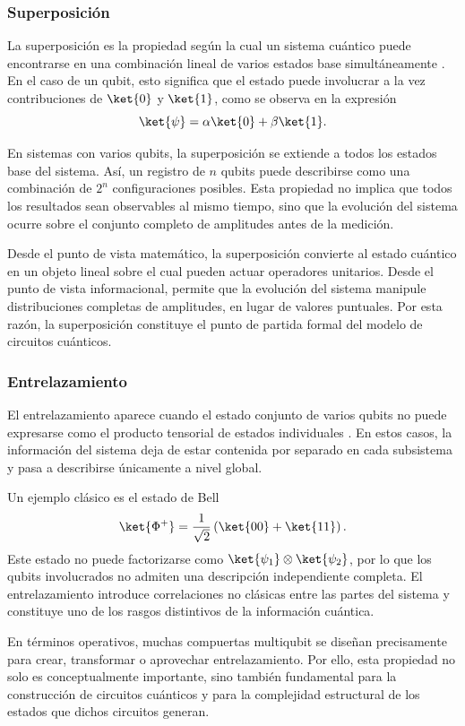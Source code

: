 \subsubsection{Superposición}

La superposición es la propiedad según la cual un sistema cuántico puede encontrarse en una combinación lineal de varios estados base simultáneamente \cite{Nielsen2010}. En el caso de un qubit, esto significa que el estado puede involucrar a la vez contribuciones de $\ket{0}$ y $\ket{1}$, como se observa en la expresión
\[
    \ket{\psi} = \alpha \ket{0} + \beta \ket{1}.
\]

En sistemas con varios qubits, la superposición se extiende a todos los estados base del sistema. Así, un registro de $n$ qubits puede describirse como una combinación de $2^n$ configuraciones posibles. Esta propiedad no implica que todos los resultados sean observables al mismo tiempo, sino que la evolución del sistema ocurre sobre el conjunto completo de amplitudes antes de la medición.

Desde el punto de vista matemático, la superposición convierte al estado cuántico en un objeto lineal sobre el cual pueden actuar operadores unitarios. Desde el punto de vista informacional, permite que la evolución del sistema manipule distribuciones completas de amplitudes, en lugar de valores puntuales. Por esta razón, la superposición constituye el punto de partida formal del modelo de circuitos cuánticos.

\subsubsection{Entrelazamiento}

El entrelazamiento aparece cuando el estado conjunto de varios qubits no puede expresarse como el producto tensorial de estados individuales \cite{Nielsen2010}. En estos casos, la información del sistema deja de estar contenida por separado en cada subsistema y pasa a describirse únicamente a nivel global.

Un ejemplo clásico es el estado de Bell
\[
    \ket{\Phi^+} = \frac{1}{\sqrt{2}}\left(\ket{00} + \ket{11}\right).
\]
Este estado no puede factorizarse como $\ket{\psi_1} \otimes \ket{\psi_2}$, por lo que los qubits involucrados no admiten una descripción independiente completa. El entrelazamiento introduce correlaciones no clásicas entre las partes del sistema y constituye uno de los rasgos distintivos de la información cuántica.

En términos operativos, muchas compuertas multiqubit se diseñan precisamente para crear, transformar o aprovechar entrelazamiento. Por ello, esta propiedad no solo es conceptualmente importante, sino también fundamental para la construcción de circuitos cuánticos y para la complejidad estructural de los estados que dichos circuitos generan.


